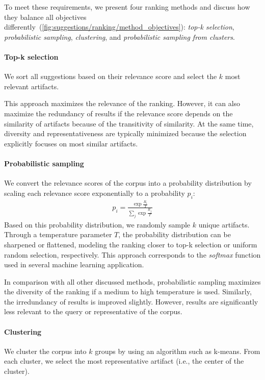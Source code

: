 \noindent
To meet these requirements, we present four ranking methods and discuss how they balance all objectives differently~(\cref{fig:suggestions/ranking/method_objectives}): \emph{top-k selection}, \emph{probabilistic sampling}, \emph{clustering}, and \emph{probabilistic sampling from clusters}.

\paragraph{Top-k selection}
We sort all suggestions based on their relevance score and select the $k$ most relevant artifacts.

This approach maximizes the relevance of the ranking.
However, it can also maximize the redundancy of results if the relevance score depends on the similarity of artifacts because of the transitivity of similarity.
At the same time, diversity and representativeness are typically minimized because the selection explicitly focuses on most similar artifacts.

\paragraph{Probabilistic sampling}
We convert the relevance scores of the corpus into a probability distribution by scaling each relevance score exponentially to a probability $p_i$:
\begin{align}
	p_i = \frac{\exp \frac{R_i}{T}}{\sum_j \exp \frac{R_j}{T}}
\end{align}
Based on this probability distribution, we randomly sample $k$ unique artifacts.
Through a temperature parameter $T$, the probability distribution can be sharpened or flattened, modeling the ranking closer to top-k selection or uniform random selection, respectively.
This approach corresponds to the \emph{softmax} function used in several machine learning application.

In comparison with all other discussed methods, probabilistic sampling maximizes the diversity of the ranking if a medium to high temperature is used.
Similarly, the irredundancy of results is improved slightly.
However, results are significantly less relevant to the query or representative of the corpus.

\paragraph{Clustering}
We cluster the corpus into $k$ groups by using an algorithm such as k-means.
From each cluster, we select the most representative artifact (i.e., the center of the cluster).


